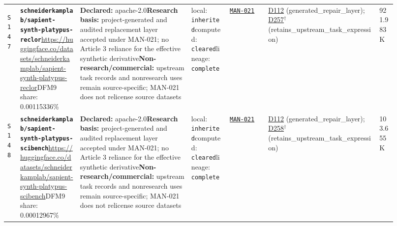 \documentclass[9pt,a4paper]{article}
\newcommand{\srcid}[1]{\hypertarget{src:#1}{\texttt{#1}}}
\begin{document}
\begin{landscape}
\begin{longtable}{@{}L{0.03\linewidth}L{0.14\linewidth}L{0.26\linewidth}L{0.09\linewidth}L{0.09\linewidth}L{0.265\linewidth}L{0.045\linewidth}@{}}
\srcid{S147} & \textbf{\nolinkurl{schneiderkamplab/sapient-synth-platypus-reclor}}\newline \url{https://huggingface.co/datasets/schneiderkamplab/sapient-synth-platypus-reclor}\newline DFM9 share: 0.00115336\% & \textbf{Declared:} apache-2.0\newline \textbf{Research basis:} project-generated and audited replacement layer accepted under MAN-021; no Article 3 reliance for the effective synthetic derivative\newline \textbf{Non-research/commercial:} upstream task records and nonresearch uses remain source-specific; MAN-021 does not relicense source datasets & local: \texttt{inherited}\newline computed: \texttt{cleared}\newline lineage: \texttt{complete} & \hyperlink{manual:MAN-021}{\texttt{MAN-021}} & \hyperlink{dep:D112}{D112} (generated\_repair\_layer); \hyperlink{dep:D257}{D257}$^{\dagger}$ (retains\_upstream\_task\_expression) & 921.983K \\
\srcid{S148} & \textbf{\nolinkurl{schneiderkamplab/sapient-synth-platypus-scibench}}\newline \url{https://huggingface.co/datasets/schneiderkamplab/sapient-synth-platypus-scibench}\newline DFM9 share: 0.00012967\% & \textbf{Declared:} apache-2.0\newline \textbf{Research basis:} project-generated and audited replacement layer accepted under MAN-021; no Article 3 reliance for the effective synthetic derivative\newline \textbf{Non-research/commercial:} upstream task records and nonresearch uses remain source-specific; MAN-021 does not relicense source datasets & local: \texttt{inherited}\newline computed: \texttt{cleared}\newline lineage: \texttt{complete} & \hyperlink{manual:MAN-021}{\texttt{MAN-021}} & \hyperlink{dep:D112}{D112} (generated\_repair\_layer); \hyperlink{dep:D258}{D258}$^{\dagger}$ (retains\_upstream\_task\_expression) & 103.655K \\

\end{longtable}
\end{landscape}
\end{document}
